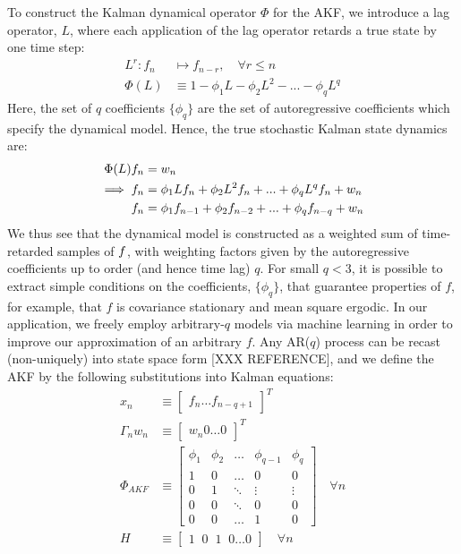 \documentclass[pra, reprint]{revtex4-1}
\begin{document}
To construct the Kalman dynamical operator $\Phi$ for the AKF, we introduce a lag operator, $L$, where each application of the lag operator retards a true state by one time step:
\begin{align}
L^r: f_n &\mapsto f_{n-r}, \quad \forall r \leq n \\
\Phi(L) & \equiv  1 - \phi_1 L - \phi_2 L^2 - ... - \phi_q L^q 
\end{align}
Here, the set of $q$ coefficients $\{ \phi_q \}$ are the set of autoregressive coefficients which specify the dynamical model. Hence, the true stochastic Kalman state dynamics are:
\begin{align}
\Phi(L) f_n & = w_n \\ 
\implies f_n & = \phi_1 L f_n + \phi_2 L^2 f_n + ... + \phi_q L^q f_n + w_n \\
 f_n &= \phi_1 f_{n-1} + \phi_2 f_{n-2} + ... + \phi_q f_{n-q} + w_n \label{eqn:main:ARprocess}
\end{align}
We thus see that the dynamical model is constructed as a weighted sum of time-retarded samples of $f$, with weighting factors given by the autoregressive coefficients up to order (and hence time lag) $q$.  %
For small $q < 3$, it is possible to extract simple conditions on the coefficients, $\{ \phi_q \}$, that guarantee properties of $f$, for example, that $f$ is covariance stationary and mean square ergodic. In our application, we freely employ arbitrary-$q$ models via machine learning in order to improve our approximation of an arbitrary $f$. Any AR($q$) process can be recast (non-uniquely) into state space form [XXX REFERENCE], and we define the AKF by the following substitutions into Kalman equations:
\begin{align}
x_n & \equiv  \begin{bmatrix} f_{n} \hdots f_{n-q+1} \end{bmatrix}^T \\
\Gamma_n w_n & \equiv \begin{bmatrix} w_{n} 0 \hdots 0 \end{bmatrix}^T \\
\Phi_{AKF} & \equiv 
\begin{bmatrix}
\phi_1 & \phi_2 & \hdots & \phi_{q-1} & \phi_q \\ 
1 & 0 & \hdots & 0 & 0 \\  
0 & 1 & \ddots & \vdots & \vdots \\ 
0 & 0 & \ddots & 0 & 0 \\ 
0 & 0 & \hdots & 1 & 0 
\end{bmatrix} \quad \forall n \label{eqn:akf_Phi} \\
H & \equiv \begin{bmatrix} 1\;\;0\;\;1\;\;0\hdots0 \end{bmatrix} \quad \forall n  
\end{align}
\end{document}
